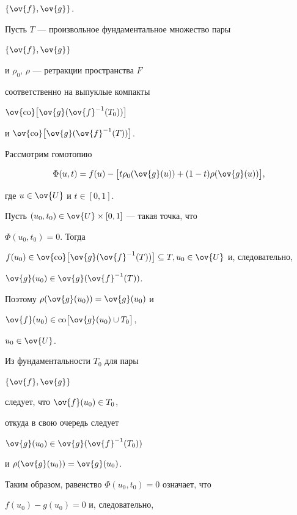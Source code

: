 $\{\ov{f}, \ov{g} \}$.


Пусть $T$ --- произвольное фундаментальное множество пары 


$\{\ov{f}, \ov{g} \}$


и $\rho_0$, $\rho $ --- ретракции пространства $F$


соответственно на выпуклые компакты


$\ov {\co} \bigl[\ov{g} (\ov{f}^{-1}(T_0)) \bigr]$


и $\ov {\co} \bigl[\ov{g} (\ov{f}^{-1}(T)) \bigr]$.





Рассмотрим гомотопию 


$$


\Phi (u,t) = f(u) - \bigl[t \rho_0(\ov {g}(u)) + 


(1-t) \rho (\ov {g}(u)) \bigr],


$$


где $u \in \ov {U}$ и $t \in [0,1]$.





Пусть $(u_0,t_0) \in \ov {U}\times [0,1]$ --- такая точка, что 


$\Phi (u_0,t_0) = 0$. Тогда


$f(u_0) \in \ov {\co} 


\bigl[\ov{g} (\ov{f}^{-1}(T)) \bigr]


\subseteq T, u_0 \in \ov {U}$ и, следовательно, 


$\ov {g} (u_0) \in \ov {g} (\ov{f}^{-1}(T))$.


Поэтому $ \rho (\ov {g} (u_0)) = \ov {g} (u_0)$ и


$ \ov {f}(u_0) \in\co 


\bigl[\ov {g}(u_0) \cup T_0 \bigr]$,


$u_0 \in \ov {U}$.


Из фундаментальности $T_0$ для пары


$\{\ov{f}, \ov{g} \}$


следует, что $\ov {f}(u_0) \in T_0$,


откуда в свою очередь следует


$\ov {g} (u_0) \in \ov {g} (\ov {f}^{-1}(T_0))$


и $\rho (\ov {g} (u_0)) =  \ov {g} (u_0)$.


Таким образом, равенство $\Phi (u_0,t_0) = 0$ означает, что 


$f(u_0) - g(u_0) = 0$ и, следовательно,



